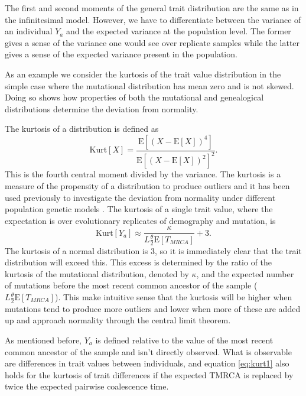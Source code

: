 \documentclass{article}
\newcommand{\T}{\frac{\theta}{2}}
\newcommand{\E}{\mathrm{E}}
\begin{document}
The first and second moments of the general trait distribution are the same as
in the infinitesimal model. However, we have to differentiate between the
variance of an individual $Y_a$ and the expected variance at the population
level. The former gives a sense of the variance one would see over replicate
samples while the latter gives a sense of the expected variance present in the
population. 

As an example we consider the kurtosis of the trait value distribution in the
simple case where the mutational distribution has mean zero and is not skewed.
Doing so shows how properties of both the mutational and genealogical
distributions determine the deviation from normality.

The kurtosis of a distribution is defined as
\begin{equation*}
  \mbox{Kurt}[X]=\frac{\E[(X-\E[X])^4]}{\E[(X-\E[X])^2]^2}.
\end{equation*}
This is the fourth central moment divided by the variance. The kurtosis is a
measure of the propensity of a distribution to produce outliers
\citep{Westfall2014} and it has been used previously to investigate the
deviation from normality under different population genetic models
\citep{Nei1966,Chakraborty1982}. The kurtosis of a single trait value, where the
expectation is over evolutionary replicates of demography and mutation, is
\begin{equation}
  \label{eq:kurt1}
  \mbox{Kurt}[Y_a] \approx \frac{\kappa}{L\T \E[T_{MRCA}]} + 3.
\end{equation}
The kurtosis of a normal distribution is $3$, so it is immediately clear that
the trait distribution will exceed this. This excess is determined by the ratio
of the kurtosis of the mutational distribution, denoted by $\kappa$, and the
expected number of mutations before the most recent common ancestor of the
sample ($L\T \E[T_{MRCA}]$). This make intuitive sense that the kurtosis will be
higher when mutations tend to produce more outliers and lower when more of these
are added up and approach normality through the central limit theorem.

As mentioned before, $Y_a$ is defined relative to the value of the most recent
common ancestor of the sample and isn't directly observed. What is observable
are differences in trait values between individuals, and equation
\eqref{eq:kurt1} also holds for the kurtosis of trait differences if the
expected TMRCA is replaced by twice the expected pairwise coalescence time.
\end{document}
